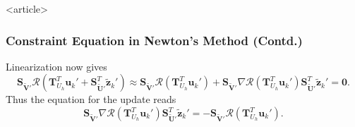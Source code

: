 \begin{frame}<article>
\frametitle<presentation>{Constraint Equation in Newton's Method (Contd.)}
Linearization now gives
\begin{equation*}
\mathbf{S}_{\tilde{\mathbf{V}}'}
\mathcal{R}\left(\mathbf{T}^T_{U_h}\mathbf{u}_{k}' +
\mathbf{S}^T_{\tilde{\mathbf{U}}'} \tilde{\mathbf{z}}_{k}'\right)
\approx \mathbf{S}_{\tilde{\mathbf{V}}'}
\mathcal{R}\left(\mathbf{T}^T_{U_h}\mathbf{u}_{k}'\right)
+ \mathbf{S}_{\tilde{\mathbf{V}}'} \nabla
\mathcal{R}\left(\mathbf{T}^T_{U_h}\mathbf{u}_{k}'\right)
\mathbf{S}^T_{\tilde{\mathbf{U}}'} \tilde{\mathbf{z}}_{k}' = \mathbf{0}.
\end{equation*}
Thus the equation for the update reads
\begin{equation*}
\mathbf{S}_{\tilde{\mathbf{V}}'} \nabla
\mathcal{R}\left(\mathbf{T}^T_{U_h}\mathbf{u}_{k}'\right)
\mathbf{S}^T_{\tilde{\mathbf{U}}'} \tilde{\mathbf{z}}_{k}'
= - \mathbf{S}_{\tilde{\mathbf{V}}'}
\mathcal{R}\left(\mathbf{T}^T_{U_h}\mathbf{u}_{k}'\right) .
\end{equation*}
\end{frame}

\cleardoublepage
